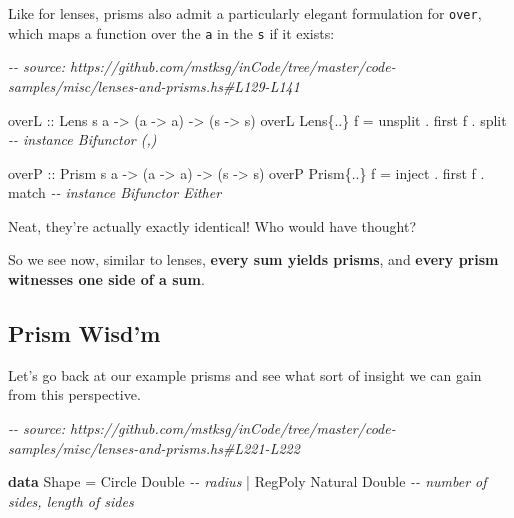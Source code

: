 \documentclass[]{article}
\newenvironment{Shaded}{}{}
\newcommand{\CommentTok}[1]{\textcolor[rgb]{0.38,0.63,0.69}{\textit{#1}}}
\newcommand{\DataTypeTok}[1]{\textcolor[rgb]{0.56,0.13,0.00}{#1}}
\newcommand{\KeywordTok}[1]{\textcolor[rgb]{0.00,0.44,0.13}{\textbf{#1}}}
\newcommand{\NormalTok}[1]{#1}
\newcommand{\OperatorTok}[1]{\textcolor[rgb]{0.40,0.40,0.40}{#1}}
\newcommand{\OtherTok}[1]{\textcolor[rgb]{0.00,0.44,0.13}{#1}}
\begin{document}
Like for lenses, prisms also admit a particularly elegant formulation for
\texttt{over}, which maps a function over the \texttt{a} in the \texttt{s} if it
exists:

\begin{Shaded}
\begin{Highlighting}[]
\CommentTok{{-}{-} source: https://github.com/mstksg/inCode/tree/master/code{-}samples/misc/lenses{-}and{-}prisms.hs\#L129{-}L141}

\OtherTok{overL ::} \DataTypeTok{Lens\textquotesingle{}}\NormalTok{ s a }\OtherTok{{-}>}\NormalTok{ (a }\OtherTok{{-}>}\NormalTok{ a) }\OtherTok{{-}>}\NormalTok{ (s }\OtherTok{{-}>}\NormalTok{ s)}
\NormalTok{overL }\DataTypeTok{Lens\textquotesingle{}}\NormalTok{\{}\OperatorTok{..}\NormalTok{\}  f }\OtherTok{=}\NormalTok{ unsplit }\OperatorTok{.}\NormalTok{ first f }\OperatorTok{.}\NormalTok{ split   }\CommentTok{{-}{-} instance Bifunctor (,)}

\OtherTok{overP ::} \DataTypeTok{Prism\textquotesingle{}}\NormalTok{ s a }\OtherTok{{-}>}\NormalTok{ (a }\OtherTok{{-}>}\NormalTok{ a) }\OtherTok{{-}>}\NormalTok{ (s }\OtherTok{{-}>}\NormalTok{ s)}
\NormalTok{overP }\DataTypeTok{Prism\textquotesingle{}}\NormalTok{\{}\OperatorTok{..}\NormalTok{\} f }\OtherTok{=}\NormalTok{ inject }\OperatorTok{.}\NormalTok{ first f }\OperatorTok{.}\NormalTok{ match    }\CommentTok{{-}{-} instance Bifunctor Either}
\end{Highlighting}
\end{Shaded}

Neat, they're actually exactly identical! Who would have thought?

So we see now, similar to lenses, \textbf{every sum yields prisms}, and
\textbf{every prism witnesses one side of a sum}.

\hypertarget{prism-wisdm}{%
\subsection{Prism Wisd'm}\label{prism-wisdm}}

Let's go back at our example prisms and see what sort of insight we can gain
from this perspective.

\begin{Shaded}
\begin{Highlighting}[]
\CommentTok{{-}{-} source: https://github.com/mstksg/inCode/tree/master/code{-}samples/misc/lenses{-}and{-}prisms.hs\#L221{-}L222}

\KeywordTok{data} \DataTypeTok{Shape} \OtherTok{=} \DataTypeTok{Circle}  \DataTypeTok{Double}           \CommentTok{{-}{-} radius}
           \OperatorTok{|} \DataTypeTok{RegPoly} \DataTypeTok{Natural} \DataTypeTok{Double}   \CommentTok{{-}{-} number of sides, length of sides}
\end{Highlighting}
\end{Shaded}
\end{document}
